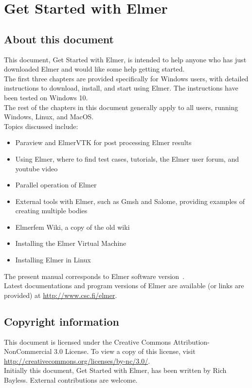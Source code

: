 \chapter*{Get Started with Elmer}

\section*{About this document}

This document, Get Started with Elmer, is intended to help anyone who has just downloaded Elmer and would like some help getting started.\\

The first three chapters are provided specifically for Windows users, with detailed instructions to download, install, and start using Elmer.  The instructions have been tested on Windows 10.\\

The rest of the chapters in this document generally apply to all users, running Windows, Linux, and MacOS.\\

Topics discussed include:

\begin{itemize}
  \item Paraview and ElmerVTK for post processing Elmer results
  \item Using Elmer, where to find test cases, tutorials, the Elmer user forum, and youtube video
  \item Parallel operation of Elmer
  \item External tools with Elmer, such as Gmsh and Salome, providing examples of creating multiple bodies
  \item Elmerfem Wiki, a copy of the old wiki
  \item Installing the Elmer Virtual Machine
  \item Installing Elmer in Linux
\end{itemize}


The present manual corresponds to Elmer software version~\elmerversion{}.\\

Latest documentations and program versions of Elmer are available (or links are provided) at \url{http://www.csc.fi/elmer}. \\

\section*{Copyright information}

This document is licensed under the Creative Commons Attribution-NonCommercial 3.0 License.  To view a copy of this license, visit \url{http://creativecommons.org/licenses/by-nc/3.0/}.\\

Initially this document, Get Started with Elmer, has been written by Rich Bayless.  External contributions are welcome.




